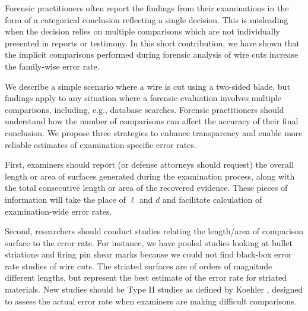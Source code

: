 \documentclass[9pt,twocolumn,twoside]{pnas-new}\usepackage[]{graphicx}\usepackage[dvipsnames]{xcolor}
\begin{document}
Forensic practitioners often report the findings from their examinations in the form of a categorical conclusion reflecting a single decision.
This is misleading when the decision relies on multiple comparisons which are not individually presented in reports or testimony.
In this short contribution, we have shown that the implicit comparisons performed during forensic analysis of wire cuts increase the family-wise error rate.

We describe a simple scenario where a wire is cut using a two-sided blade, but findings apply to any situation where a forensic evaluation involves multiple comparisons, including, e.g., database searches.  Forensic practitioners should understand how the number of comparisons can affect the accuracy of their final conclusion. We propose three strategies to enhance transparency and enable more reliable estimates of examination-specific error rates.

First, examiners should report (or defense attorneys should request) the overall length or area of surfaces generated during the examination process, along with the total consecutive length or area of the recovered evidence.
These pieces of information will take the place of $\ell$ and $d$ and facilitate calculation of examination-wide error rates.

Second, researchers should conduct studies relating the length/area of comparison surface to the error rate.
For instance, we have pooled studies looking at bullet striations and firing pin shear marks because we could not find black-box error rate studies of wire cuts.
The striated surfaces are of orders of magnitude different lengths, but represent the best estimate of the error rate for striated materials.
New studies should be Type II studies as defined by Koehler \citep{koehlerIntuitiveErrorRate2017a}, designed to assess the actual error rate when examiners are making difficult comparisons.
\end{document}
